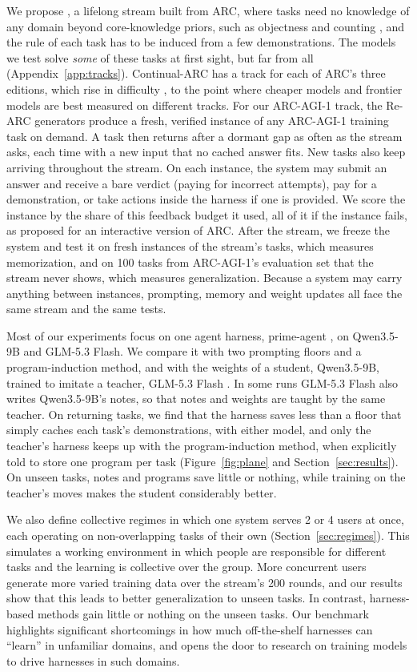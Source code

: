 We propose \bench{}, a lifelong stream built from ARC, where tasks need no knowledge of any domain beyond core-knowledge priors, such as objectness and counting \citep{chollet2019measure}, and the rule of each task has to be induced from a few demonstrations. The models we test solve \emph{some} of these tasks at first sight, but far from all (Appendix~\ref{app:tracks}). Continual-ARC has a track for each of ARC's three editions, which rise in difficulty \citep{chollet2025arcagi2,arcprize2026arcagi3}, to the point where cheaper models and frontier models are best measured on different tracks. For our ARC-AGI-1 track, the Re-ARC generators \citep{hodel2024rearc} produce a fresh, verified instance of any ARC-AGI-1 training task on demand. A task then returns after a dormant gap as often as the stream asks, each time with a new input that no cached answer fits. New tasks also keep arriving throughout the stream. On each instance, the system may submit an answer and receive a bare verdict (paying for incorrect attempts), pay for a demonstration, or take actions inside the harness if one is provided. We score the instance by the share of this feedback budget it used, all of it if the instance fails, as \citet{chollet2019measure} proposed for an interactive version of ARC. After the stream, we freeze the system and test it on fresh instances of the stream's tasks, which measures memorization, and on 100 tasks from ARC-AGI-1's evaluation set that the stream never shows, which measures generalization. Because a system may carry anything between instances, prompting, memory and weight updates all face the same stream and the same tests.

Most of our experiments focus on one agent harness, prime-agent \citep{karten2026primeagent}, on Qwen3.5-9B and GLM-5.3 Flash. We compare it with two prompting floors and a program-induction method, and with the weights of a student, Qwen3.5-9B, trained to imitate a teacher, GLM-5.3 Flash \citep{ross2011dagger}. In some runs GLM-5.3 Flash also writes Qwen3.5-9B's notes, so that notes and weights are taught by the same teacher. On returning tasks, we find that the harness saves less than a floor that simply caches each task's demonstrations, with either model, and only the teacher's harness keeps up with the program-induction method, when explicitly told to store one program per task (Figure~\ref{fig:plane} and Section~\ref{sec:results}). On unseen tasks, notes and programs save little or nothing, while training on the teacher's moves makes the student considerably better.

We also define collective regimes in which one system serves 2 or 4 users at once, each operating on non-overlapping tasks of their own (Section~\ref{sec:regimes}). This simulates a working environment in which people are responsible for different tasks and the learning is collective over the group. More concurrent users generate more varied training data over the stream's 200 rounds, and our results show that this leads to better generalization to unseen tasks. In contrast, harness-based methods gain little or nothing on the unseen tasks. Our benchmark highlights significant shortcomings in how much off-the-shelf harnesses can ``learn'' in unfamiliar domains, and opens the door to research on training models to drive harnesses in such domains.
